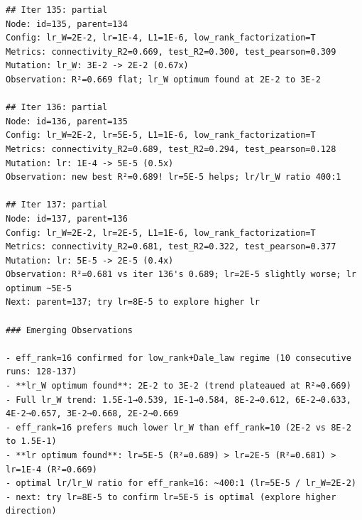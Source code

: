 \documentclass[10pt,twocolumn]{article}
\begin{document}
\begin{small}
\begin{verbatim}
## Iter 135: partial
Node: id=135, parent=134
Config: lr_W=2E-2, lr=1E-4, L1=1E-6, low_rank_factorization=T
Metrics: connectivity_R2=0.669, test_R2=0.300, test_pearson=0.309
Mutation: lr_W: 3E-2 -> 2E-2 (0.67x)
Observation: R²=0.669 flat; lr_W optimum found at 2E-2 to 3E-2

## Iter 136: partial
Node: id=136, parent=135
Config: lr_W=2E-2, lr=5E-5, L1=1E-6, low_rank_factorization=T
Metrics: connectivity_R2=0.689, test_R2=0.294, test_pearson=0.128
Mutation: lr: 1E-4 -> 5E-5 (0.5x)
Observation: new best R²=0.689! lr=5E-5 helps; lr/lr_W ratio 400:1

## Iter 137: partial
Node: id=137, parent=136
Config: lr_W=2E-2, lr=2E-5, L1=1E-6, low_rank_factorization=T
Metrics: connectivity_R2=0.681, test_R2=0.322, test_pearson=0.377
Mutation: lr: 5E-5 -> 2E-5 (0.4x)
Observation: R²=0.681 vs iter 136's 0.689; lr=2E-5 slightly worse; lr optimum ~5E-5
Next: parent=137; try lr=8E-5 to explore higher lr

### Emerging Observations

- eff_rank=16 confirmed for low_rank+Dale_law regime (10 consecutive runs: 128-137)
- **lr_W optimum found**: 2E-2 to 3E-2 (trend plateaued at R²≈0.669)
- Full lr_W trend: 1.5E-1→0.539, 1E-1→0.584, 8E-2→0.612, 6E-2→0.633, 4E-2→0.657, 3E-2→0.668, 2E-2→0.669
- eff_rank=16 prefers much lower lr_W than eff_rank=10 (2E-2 vs 8E-2 to 1.5E-1)
- **lr optimum found**: lr=5E-5 (R²=0.689) > lr=2E-5 (R²=0.681) > lr=1E-4 (R²=0.669)
- optimal lr/lr_W ratio for eff_rank=16: ~400:1 (lr=5E-5 / lr_W=2E-2)
- next: try lr=8E-5 to confirm lr=5E-5 is optimal (explore higher direction)


\end{verbatim}
\end{small}


\end{document}
